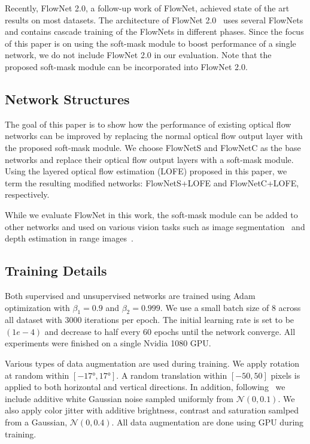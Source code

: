 \documentclass[10pt,twocolumn,letterpaper]{article}
\begin{document}
Recently, FlowNet 2.0, a follow-up work of FlowNet, achieved state of the art results on most datasets. The architecture of FlowNet 2.0~\cite{Ilg_2017_CVPR} uses several FlowNets and contains cascade training of the FlowNets in different phases. Since the focus of this paper is on using the soft-mask module to boost performance of a single network, we do not include FlowNet 2.0 in our evaluation. Note that the proposed soft-mask module can be incorporated into FlowNet 2.0.

\subsection{Network Structures}
The goal of this paper is to show how the performance of existing optical flow networks can be improved by replacing the normal optical flow output layer with the proposed soft-mask module. We choose FlowNetS and FlowNetC as the base networks and replace their optical flow output layers with a soft-mask module. Using the layered optical flow estimation (LOFE) proposed in this paper, we term the resulting modified networks: FlowNetS+LOFE and FlowNetC+LOFE, respectively. 

While we evaluate FlowNet in this work, the soft-mask module can be added to other networks and used on various vision tasks such as image segmentation~\cite{long2015fully}\cite{noh2015learning} and depth estimation in range images~\cite{eigen2014depth}\cite{eigen2015predicting}.

\subsection{Training Details}
Both supervised and unsupervised networks are trained using Adam~\cite{kingma2014adam} optimization with $\beta_1=0.9$ and $\beta_2=0.999$. We use a small batch size of 8 across all dataset with 3000 iterations per epoch. The initial learning rate is set to be $(1e-4)$ and decrease to half every 60 epochs until the network converge. All experiments were finished on a single Nvidia 1080 GPU.

Various types of data augmentation are used during training. We apply rotation at random within $[\ang{-17}, \ang{17}]$. A random translation within $[-50, 50]$ pixels is applied to both horizontal and vertical directions. In addition, following~\cite{Ranjan_2017_CVPR} we include additive white Gaussian noise sampled uniformly from $\mathcal{N}(0, 0.1)$. We also apply color jitter with additive brightness, contrast and saturation samlped from a Gaussian, $\mathcal{N}(0, 0.4)$. All data augmentation are done using GPU during training.
\end{document}
